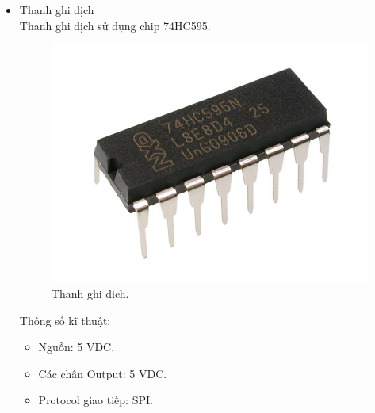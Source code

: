 \documentclass[a4paper,12pt,oneside]{article}
\begin{document}
\begin{itemize}
\item Thanh ghi dịch\\
\noindent Thanh ghi dịch sử dụng chip 74HC595.\\
\begin{figure}[h!]
\centering
\includegraphics[scale=.2]{hinh/Register.jpg}
\caption{Thanh ghi dịch.}
\end{figure}
\noindent Thông số kĩ thuật:
\begin{itemize}
	\item Nguồn: 5 VDC.
	\item Các chân Output: 5 VDC.
	\item Protocol giao tiếp: SPI.
\end{itemize}


\end{itemize}
\end{document}
